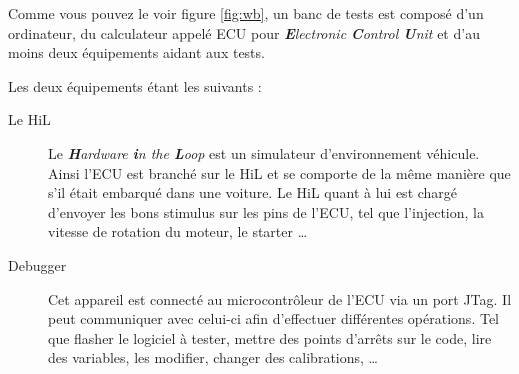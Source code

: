 		Comme vous pouvez le voir figure \ref{fig:wb}, un banc de tests est composé d'un ordinateur, du calculateur appelé ECU pour \textit{\textbf{E}lectronic \textbf{C}ontrol \textbf{U}nit} et d'au moins deux équipements aidant aux tests. 
		
		Les deux équipements étant les suivants : 
		\begin{description}
			\item[Le HiL] Le \textit{\textbf{H}ardware \textbf{i}n the \textbf{L}oop} est un simulateur d'environnement véhicule. Ainsi l'ECU est branché sur le HiL et se comporte de la même manière que s'il était embarqué dans une voiture. Le HiL quant à lui est chargé d'envoyer les bons stimulus sur les pins de l'ECU, tel que l'injection, la vitesse de rotation du moteur, le starter \ldots
			\item[Debugger] Cet {appareil} est connecté au microcontrôleur de l'ECU via un port JTag. Il peut communiquer avec celui-ci afin d'effectuer différentes opérations. Tel que flasher le logiciel à tester, mettre des points d'arrêts sur le code, lire des variables, les modifier, changer des calibrations, \ldots
		\end{description}
	
